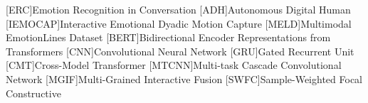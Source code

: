 \begin{acronym}
	
	[ERC]{Emotion Recognition in Conversation}
        [ADH]{Autonomous Digital Human}
	[IEMOCAP]{Interactive Emotional Dyadic Motion Capture}
	[MELD]{Multimodal EmotionLines Dataset}
        [BERT]{Bidirectional Encoder Representations from Transformers}
        [CNN]{Convolutional Neural Network}
        [GRU]{Gated Recurrent Unit}
	[CMT]{Cross-Model Transformer}
        [MTCNN]{Multi-task Cascade Convolutional Network}
        [MGIF]{Multi-Grained Interactive Fusion}
        [SWFC]{Sample-Weighted Focal Constructive}

\end{acronym}